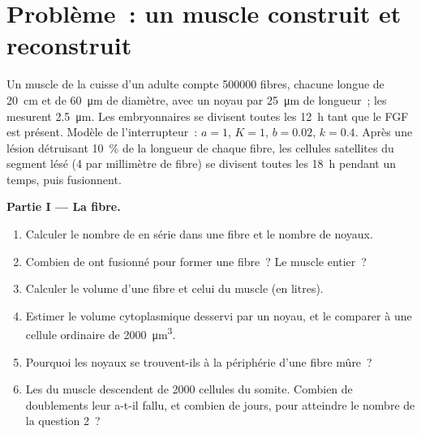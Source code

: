 \section{Problème~: un muscle construit et reconstruit}

\begin{problem}
\label{pb:b2:cell-differentiation:1}
Un muscle de la cuisse d'un adulte compte \num{500000} fibres, chacune
longue de \qty{20}{cm} et de \qty{60}{\micro m} de diamètre, avec un
noyau par \qty{25}{\micro m} de longueur~; les  mesurent
\qty{2.5}{\micro m}. Les  embryonnaires se divisent toutes les
\qty{12}{h} tant que le FGF est présent. Modèle de l'interrupteur~:
$a = 1$, $K = 1$, $b = 0.02$, $k
= 0.4$. Après une lésion détruisant \qty{10}{\%} de la longueur de
chaque fibre, les cellules satellites du segment lésé (\num{4} par
millimètre de fibre) se divisent toutes les \qty{18}{h} pendant un
temps, puis fusionnent.

\medskip
\noindent\textbf{Partie I --- La fibre.}
\begin{enumerate}
  \item Calculer le nombre de  en série dans une fibre et le
        nombre de noyaux.
  \item Combien de  ont fusionné pour former une fibre~? Le
        muscle entier~?
  \item Calculer le volume d'une fibre et celui du muscle (en litres).
  \item Estimer le volume cytoplasmique desservi par un noyau, et le
        comparer à une cellule ordinaire de \qty{2000}{\micro m^3}.
  \item Pourquoi les noyaux se trouvent-ils à la périphérie d'une fibre
        mûre~?
  \item Les  du muscle descendent de \num{2000} cellules du
        somite. Combien de doublements leur a-t-il fallu, et combien de
        jours, pour atteindre le nombre de la question 2~?
\end{enumerate}


\end{problem}
